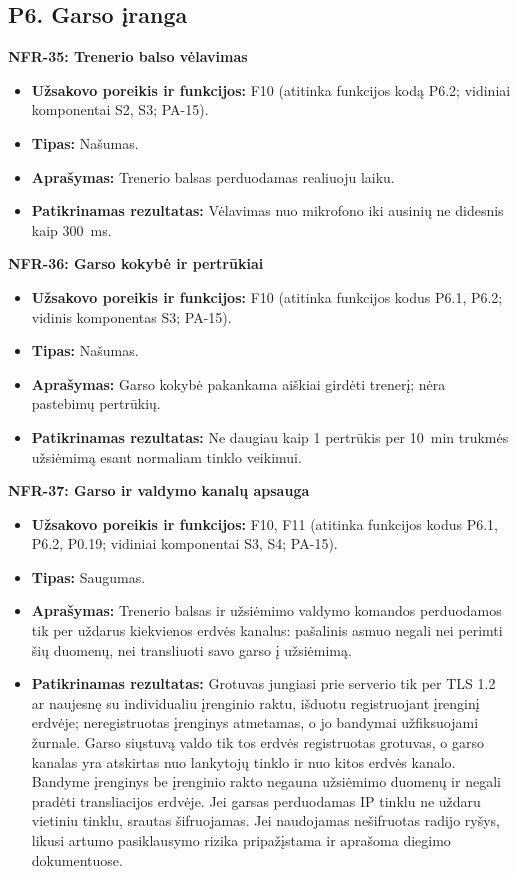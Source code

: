 \subsection{P6. Garso įranga}

\noindent\textbf{NFR-35: Trenerio balso vėlavimas}
\begin{itemize}
    \item \textbf{Užsakovo poreikis ir funkcijos:} F10 (atitinka funkcijos kodą P6.2; vidiniai komponentai S2, S3; PA-15).
    \item \textbf{Tipas:} Našumas.
    \item \textbf{Aprašymas:} Trenerio balsas perduodamas realiuoju laiku.
    \item \textbf{Patikrinamas rezultatas:} Vėlavimas nuo mikrofono iki ausinių ne didesnis kaip 300~ms.
\end{itemize}

\noindent\textbf{NFR-36: Garso kokybė ir pertrūkiai}
\begin{itemize}
    \item \textbf{Užsakovo poreikis ir funkcijos:} F10 (atitinka funkcijos kodus P6.1, P6.2; vidinis komponentas S3; PA-15).
    \item \textbf{Tipas:} Našumas.
    \item \textbf{Aprašymas:} Garso kokybė pakankama aiškiai girdėti trenerį; nėra pastebimų pertrūkių.
    \item \textbf{Patikrinamas rezultatas:} Ne daugiau kaip 1 pertrūkis per 10~min trukmės užsiėmimą esant normaliam tinklo veikimui.
\end{itemize}

\noindent\textbf{NFR-37: Garso ir valdymo kanalų apsauga}
\begin{itemize}
    \item \textbf{Užsakovo poreikis ir funkcijos:} F10, F11 (atitinka funkcijos kodus P6.1, P6.2, P0.19; vidiniai komponentai S3, S4; PA-15).
    \item \textbf{Tipas:} Saugumas.
    \item \textbf{Aprašymas:} Trenerio balsas ir užsiėmimo valdymo komandos perduodamos tik per uždarus kiekvienos erdvės kanalus: pašalinis asmuo negali nei perimti šių duomenų, nei transliuoti savo garso į užsiėmimą.
    \item \textbf{Patikrinamas rezultatas:} Grotuvas jungiasi prie serverio tik per TLS 1.2 ar naujesnę su individualiu įrenginio raktu, išduotu registruojant įrenginį erdvėje; neregistruotas įrenginys atmetamas, o jo bandymai užfiksuojami žurnale. Garso siųstuvą valdo tik tos erdvės registruotas grotuvas, o garso kanalas yra atskirtas nuo lankytojų tinklo ir nuo kitos erdvės kanalo. Bandyme įrenginys be įrenginio rakto negauna užsiėmimo duomenų ir negali pradėti transliacijos erdvėje. Jei garsas perduodamas IP tinklu ne uždaru vietiniu tinklu, srautas šifruojamas. Jei naudojamas nešifruotas radijo ryšys, likusi artumo pasiklausymo rizika pripažįstama ir aprašoma diegimo dokumentuose.
\end{itemize}

